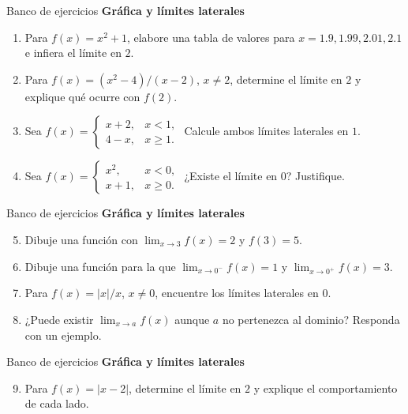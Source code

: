 \documentclass[12pt,aspectratio=169]{beamer}
\begin{document}
\begin{frame}[t,allowframebreaks]{Banco de ejercicios}
\small
\noindent \textbf{Gráfica y límites laterales}\par\smallskip
\begin{enumerate}\setcounter{enumi}{0}
\item Para $f(x)=x^2+1$, elabore una tabla de valores para $x=1.9,1.99,2.01,2.1$ e infiera el límite en $2$.
\item Para $f(x)=(x^2-4)/(x-2)$, $x\ne2$, determine el límite en $2$ y explique qué ocurre con $f(2)$.
\item Sea $f(x)=\begin{cases}x+2,&x<1,\\4-x,&x\ge1.\end{cases}$ Calcule ambos límites laterales en $1$.
\item Sea $f(x)=\begin{cases}x^2,&x<0,\\x+1,&x\ge0.\end{cases}$ ¿Existe el límite en $0$? Justifique.
\end{enumerate}
\end{frame}


\begin{frame}[t,allowframebreaks]{Banco de ejercicios}
\small
\noindent \textbf{Gráfica y límites laterales}\par\smallskip
\begin{enumerate}\setcounter{enumi}{4}
\item Dibuje una función con $\lim_{x\to3}f(x)=2$ y $f(3)=5$.
\item Dibuje una función para la que $\lim_{x\to0^-}f(x)=1$ y $\lim_{x\to0^+}f(x)=3$.
\item Para $f(x)=|x|/x$, $x\ne0$, encuentre los límites laterales en $0$.
\item ¿Puede existir $\lim_{x\to a}f(x)$ aunque $a$ no pertenezca al dominio? Responda con un ejemplo.
\end{enumerate}
\end{frame}


\begin{frame}[t,allowframebreaks]{Banco de ejercicios}
\small
\noindent \textbf{Gráfica y límites laterales}\par\smallskip
\begin{enumerate}\setcounter{enumi}{8}
\item Para $f(x)=|x-2|$, determine el límite en $2$ y explique el comportamiento de cada lado.
\end{enumerate}
\end{frame}
\end{document}
